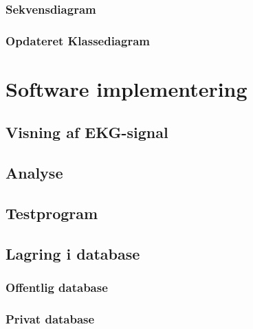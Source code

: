 \subsubsection{Sekvensdiagram}

\subsubsection{Opdateret Klassediagram}

\section{Software implementering}
 
\subsection{Visning af EKG-signal}

\subsection{Analyse}

\subsection{Testprogram}

\subsection{Lagring i database} 

\subsubsection{Offentlig database}

\subsubsection{Privat database}







